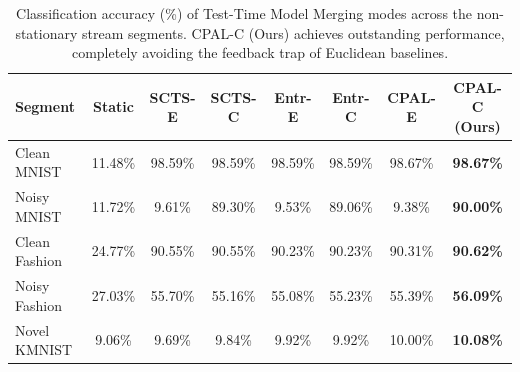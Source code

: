 \documentclass{article}
\theoremstyle{plain}
\theoremstyle{definition}
\theoremstyle{remark}
\begin{document}
\begin{table}[t]
\caption{Classification accuracy (\%) of Test-Time Model Merging modes across the non-stationary stream segments. CPAL-C (Ours) achieves outstanding performance, completely avoiding the feedback trap of Euclidean baselines.}
\label{submission:results-table}
\vskip 0.15in
\begin{center}
\begin{small}
\begin{sc}
\begin{tabular}{lccccccc}
\toprule
Segment & Static & SCTS-E & SCTS-C & Entr-E & Entr-C & CPAL-E & \textbf{CPAL-C (Ours)} \\
\midrule
Clean MNIST   & 11.48\% & 98.59\% & 98.59\% & 98.59\% & 98.59\% & 98.67\% & \textbf{98.67\%} \\
Noisy MNIST   & 11.72\% &  9.61\% & 89.30\% &  9.53\% & 89.06\% &  9.38\% & \textbf{90.00\%} \\
Clean Fashion & 24.77\% & 90.55\% & 90.55\% & 90.23\% & 90.23\% & 90.31\% & \textbf{90.62\%} \\
Noisy Fashion & 27.03\% & 55.70\% & 55.16\% & 55.08\% & 55.23\% & 55.39\% & \textbf{56.09\%} \\
Novel KMNIST  &  9.06\% &  9.69\% &  9.84\% &  9.92\% &  9.92\% & 10.00\% & \textbf{10.08\%} \\
\bottomrule
\end{tabular}
\end{sc}
\end{small}
\end{center}
\vskip -0.1in
\end{table}
\end{document}

